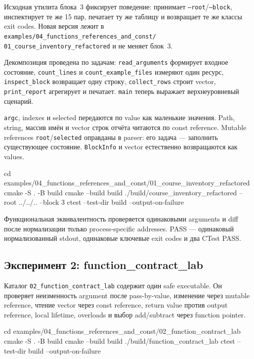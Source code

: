 Исходная утилита блока~3 фиксирует поведение: принимает
\texttt{--root}/\texttt{--block}, инспектирует те же 15 пар, печатает ту же
таблицу и возвращает те же классы exit codes. Новая версия лежит в
\texttt{examples/04\_functions\_references\_and\_const/
01\_course\_inventory\_refactored} и не меняет блок~3.

Декомпозиция проведена по задачам: \texttt{read\_arguments} формирует входное
состояние, \texttt{count\_lines} и \texttt{count\_example\_files} измеряют
один ресурс, \texttt{inspect\_block} возвращает одну строку,
\texttt{collect\_rows} строит vector, \texttt{print\_report} агрегирует и
печатает. \texttt{main} теперь выражает верхнеуровневый сценарий.

\texttt{argc}, indexes и selected передаются по value как маленькие значения.
Path, string, массив имён и vector строк отчёта читаются по const reference.
Mutable references \texttt{root}/\texttt{selected} оправданы в parser: его
задача --- заполнить существующее состояние. \texttt{BlockInfo} и vector
естественно возвращаются как values.

\begin{shellcode}
cd examples/04_functions_references_and_const/01_course_inventory_refactored
cmake -S . -B build
cmake --build build
./build/course_inventory_refactored --root ../../.. --block 3
ctest --test-dir build --output-on-failure
\end{shellcode}

Функциональная эквивалентность проверяется одинаковыми arguments и diff после
нормализации только process-specific addresses. PASS --- одинаковый
нормализованный stdout, одинаковые ключевые exit codes и два CTest PASS.

\subsection{Эксперимент 2: function\_contract\_lab}

Каталог \texttt{02\_function\_contract\_lab} содержит один safe executable.
Он проверяет неизменность argument после pass-by-value, изменение через
mutable reference, чтение vector через const reference, return value против
output reference, local lifetime, overloads и выбор add/subtract через
function pointer.

\begin{shellcode}
cd examples/04_functions_references_and_const/02_function_contract_lab
cmake -S . -B build
cmake --build build
./build/function_contract_lab
ctest --test-dir build --output-on-failure
\end{shellcode}


